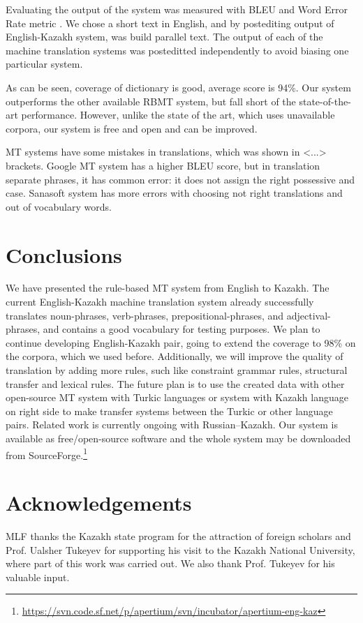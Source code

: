 \documentclass[11pt]{article}
\begin{document}
Evaluating the output of the system was measured with BLEU \citep{papineni02} and Word Error Rate 
metric \citep{levenshtein/1966}. We chose a short text in English, and by postediting output 
of English-Kazakh system, was build parallel text. The output of each of the machine
translation systems was posteditted independently to avoid biasing one particular system.

As can be seen,  coverage of dictionary is good, average score is 94\%. Our system outperforms the other 
available RBMT system, but fall short of the state-of-the-art performance. However, unlike the state of 
the art, which uses unavailable corpora, our system is free and open and can be improved.

MT systems have some mistakes in translations, which was shown in <...> brackets. Google MT system 
has a higher BLEU score, but in translation separate phrases, it has common error: it does not assign 
the right possessive and case. Sanasoft system has more errors with choosing not right translations 
and out of vocabulary words.

\section{Conclusions}

We have presented the rule-based MT system from English to Kazakh. The current English-Kazakh machine translation 
system already successfully translates noun-phrases, verb-phrases, prepositional-phrases, and adjectival-phrases, and 
contains a good vocabulary for testing purposes. 
We plan to continue developing English-Kazakh pair, going to extend the coverage to 98\% on the corpora, 
which we used before. Additionally, we will improve the quality of translation by adding more rules, such like 
constraint grammar rules, structural transfer and lexical rules. The future plan is to use the created data with other 
open-source MT system with Turkic languages or system with Kazakh language on right side to make transfer systems 
between the Turkic or other language pairs. Related work is currently ongoing with Russian--Kazakh. 
Our system is available as free/open-source software and the whole system may be downloaded 
from SourceForge.\footnote{\url{https://svn.code.sf.net/p/apertium/svn/incubator/apertium-eng-kaz}}

\section*{Acknowledgements}

MLF thanks the Kazakh state program for the attraction of foreign scholars and Prof. Ualsher Tukeyev for supporting his visit to the Kazakh National University, where part of this work was carried out. We also thank Prof. Tukeyev for his valuable input.




\end{document}

